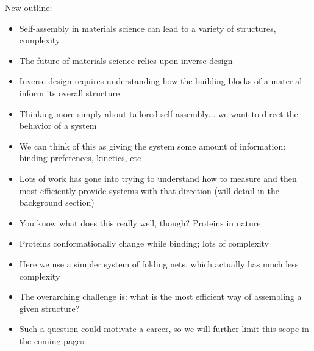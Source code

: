 New outline: 
\begin{itemize}
\item Self-assembly in materials science can lead to a variety of structures, complexity
\item The future of materials science relies upon inverse design
\item Inverse design requires understanding how the building blocks of a material inform its overall structure
\item Thinking more simply about tailored self-assembly... we want to direct the behavior of a system
\item We can think of this as giving the system some amount of information: binding preferences, kinetics, etc
\item Lots of work has gone into trying to understand how to measure and then most efficiently provide systems with that direction (will detail in the background section)
\item You know what does this really well, though? Proteins in nature
\item Proteins conformationally change while binding; lots of complexity
\item Here we use a simpler system of folding nets, which actually has much less complexity
\item The overarching challenge is: what is the most efficient way of assembling a given structure?
\item Such a question could motivate a career, so we will further limit this scope in the coming pages.
\end{itemize}
